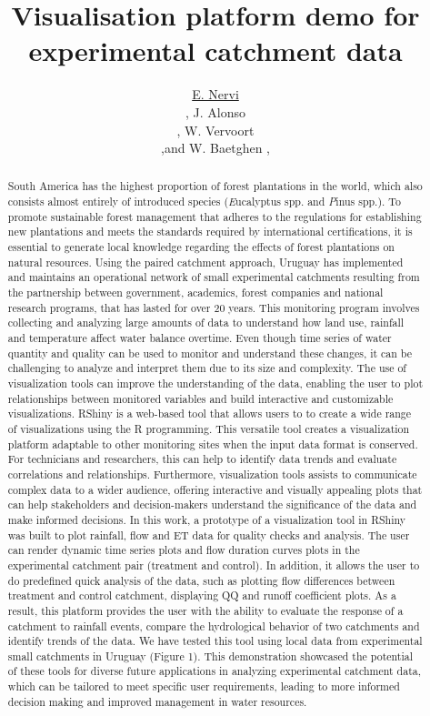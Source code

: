 \documentclass[a4paper,fleqn]{article} %
\title{Visualisation platform demo for experimental catchment data
 } %
\author{\underline{E. Nervi} %
 \address[A1]{\it{Instituto Nacional de Investigación Agropecuaria (INIA), FPTA 358,  Montevideo, Uruguay }} \orcid{0000-0000-0000-0000}, J. Alonso \address[B1]{\it{IMFIA, School of Engineering, Universidad de la República, Montevideo, Uruguay}}, W. Vervoort \address[C1]{\it{The University of Sydney, Sydney, Australia}},and W. Baetghen \addressmark[D1],\address[D1]{\it{IRI, The Earth Institute, Columbia University, New York, United States}}
}
\begin{document}
\begin{abstract}

South America has the highest proportion of forest plantations in the world, which also consists almost entirely of introduced species (\textit Eucalyptus spp. and \textit Pinus spp.). To promote sustainable forest management that adheres to the regulations for establishing new plantations and meets the standards required by international certifications, it is essential to generate local knowledge regarding the effects of forest plantations on natural resources. Using the paired catchment approach, Uruguay has implemented and maintains an operational network of small experimental catchments resulting from the partnership between government, academics, forest companies and national research programs, that has lasted for over 20 years. This monitoring program involves collecting and analyzing large amounts of data to understand how land use, rainfall and temperature affect water balance overtime. Even though time series of water quantity and quality can be used to monitor and understand these changes, it can be challenging to analyze and interpret them due to its size and complexity. The use of visualization tools can improve the understanding of the data, enabling the user to plot relationships between monitored variables and build interactive and customizable visualizations. RShiny is a web-based tool that allows users to to create a wide range of visualizations using the R programming. This versatile tool creates a visualization platform adaptable to other monitoring sites when the input data format is conserved. For technicians and researchers, this can help to identify data trends and evaluate correlations and relationships. Furthermore, visualization tools assists to communicate complex data to a wider audience, offering interactive and visually appealing plots that can help stakeholders and decision-makers understand the significance of the data and make informed decisions. In this work, a prototype of a visualization tool in RShiny was built to plot rainfall, flow and ET data for quality checks and analysis. The user can render dynamic time series plots and flow duration curves plots in the experimental catchment pair (treatment and control). In addition, it allows the user to do predefined quick analysis of the data, such as plotting flow differences between treatment and control catchment, displaying QQ and runoff coefficient plots. As a result, this platform provides the user with the ability to evaluate the response of a catchment to rainfall events, compare the hydrological behavior of two catchments and identify trends of the data.  We have tested this tool using local data from experimental small catchments in Uruguay (Figure 1). This demonstration showcased the potential of these tools for diverse future applications in analyzing experimental catchment data, which can be tailored to meet specific user requirements, leading to more informed decision making and improved management in water resources. 
\end{abstract}
\end{document}
